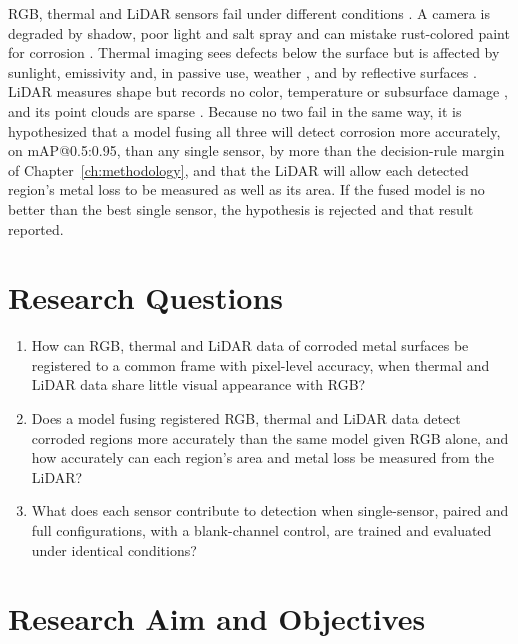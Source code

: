 RGB, thermal and LiDAR sensors fail under different conditions \citep{Tran2024}.
A camera is degraded by shadow, poor light and salt spray
\citep{Soares2023,Mao2026,Espinoza2026} and can mistake rust-colored paint for
corrosion \citep{Espinoza2026,Lavadiya2022}. Thermal imaging sees defects below
the surface \citep{Elizalde2023,Doshvarpassand2022,Hernndez-Surez2026} but is
affected by sunlight, emissivity and, in passive use, weather
\citep{Elizalde2023,Egodawela2025}, and by reflective surfaces \citep{Tran2024}.
LiDAR measures shape but records no color, temperature or subsurface damage
\citep{Ding2025}, and its point clouds are sparse \citep{Tran2024}. Because no two
fail in the same way, it is hypothesized that a model fusing all three will detect
corrosion more accurately, on mAP@0.5:0.95, than any single sensor, by more than
the decision-rule margin of Chapter~\ref{ch:methodology}, and that the LiDAR will
allow each detected region's metal loss to be measured as well as its area. If the
fused model is no better than the best single sensor, the hypothesis is rejected
and that result reported.

\section{Research Questions}
\label{sec:research-questions}

\begin{enumerate}[label=RQ\arabic*.,leftmargin=*,itemsep=8pt]
  \item How can RGB, thermal and LiDAR data of corroded metal surfaces be
        registered to a common frame with pixel-level accuracy, when thermal and
        LiDAR data share little visual appearance with RGB?
  \item Does a model fusing registered RGB, thermal and LiDAR data detect
        corroded regions more accurately than the same model given RGB alone,
        and how accurately can each region's area and metal loss be measured
        from the LiDAR?
  \item What does each sensor contribute to detection when single-sensor,
        paired and full configurations, with a blank-channel control, are trained
        and evaluated under identical conditions?
\end{enumerate}

\section{Research Aim and Objectives}
\label{sec:aim-objectives}


